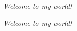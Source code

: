 \documentclass{beamer}
\begin{document}
    \begin{frame}{}
        \textsl{Welcome to my world!}

        \textit{Welcome to my world!}
    \end{frame}
\end{document}

